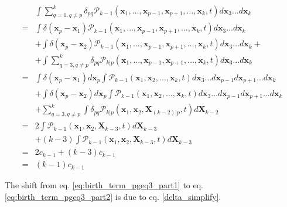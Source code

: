 \begin{subequations} 
\begin{flalign}
 & \int\sum_{q=1,q\neq p}^{k}\delta_{pq}\mathcal{P}_{k-1}(\boldsymbol{x}_{1},\ldots,\boldsymbol{x}_{p-1},\boldsymbol{x}_{p+1},\ldots,\boldsymbol{x}_{k},t)d\boldsymbol{x}_{3}\ldots d\boldsymbol{x}_{k}\\
= & \int\delta(\boldsymbol{x}_{p}-\boldsymbol{x}_{1})\mathcal{P}_{k-1}(\boldsymbol{x}_{1},\ldots,\boldsymbol{x}_{p-1},\boldsymbol{x}_{p+1},\ldots,\boldsymbol{x}_{k},t)d\boldsymbol{x}_{3}\ldots d\boldsymbol{x}_{k}\\
 & +\int\delta(\boldsymbol{x}_{p}-\boldsymbol{x}_{2})\mathcal{P}_{k-1}(\boldsymbol{x}_{1},\ldots,\boldsymbol{x}_{p-1},\boldsymbol{x}_{p+1},\ldots,\boldsymbol{x}_{k},t)d\boldsymbol{x}_{3}\ldots d\boldsymbol{x}_{k}+\\
 & +\int\sum_{q=3,q\neq p}^{k}\delta_{pq}\mathcal{P}_{k|p}(\boldsymbol{x}_{1},\ldots,\boldsymbol{x}_{p-1},\boldsymbol{x}_{p+1},\ldots,\boldsymbol{x}_{k},t)d\boldsymbol{x}_{3}\ldots d\boldsymbol{x}_{k}\\
= & \int\delta(\boldsymbol{x}_{p}-\boldsymbol{x}_{1})d\boldsymbol{x}_{p}\int\mathcal{P}_{k-1}(\boldsymbol{x}_{1},\boldsymbol{x}_{2},\ldots,\boldsymbol{x}_{k},t)d\boldsymbol{x}_{3}\ldots d\boldsymbol{x}_{p-1}d\boldsymbol{x}_{p+1}\ldots d\boldsymbol{x}_{k}\\
 & +\int\delta(\boldsymbol{x}_{p}-\boldsymbol{x}_{2})d\boldsymbol{x}_{p}\int\mathcal{P}_{k-1}(\boldsymbol{x}_{1},\boldsymbol{x}_{2},\ldots,\boldsymbol{x}_{k},t)d\boldsymbol{x}_{3}\ldots d\boldsymbol{x}_{p-1}d\boldsymbol{x}_{p+1}\ldots d\boldsymbol{x}_{k}\\
 & +\sum_{q=3,q\neq p}^{k}\int\delta_{pq}\mathcal{P}_{k|p}(\boldsymbol{x}_{1},\boldsymbol{x}_{2},\boldsymbol{X}_{(k-2)|p},t)d\boldsymbol{X}_{k-2}\label{eq:birth_term_pgeq3_part1}\\
= & 2\int\mathcal{P}_{k-1}(\boldsymbol{x}_{1},\boldsymbol{x}_{2},\boldsymbol{X}_{k-3},t)d\boldsymbol{X}_{k-3}\\
 & +(k-3)\int\mathcal{P}_{k-1}(\boldsymbol{x}_{1},\boldsymbol{x}_{2},\boldsymbol{X}_{k-3},t)d\boldsymbol{X}_{k-3}\label{eq:birth_term_pgeq3_part2}\\
= & 2c_{k-1}+(k-3)c_{k-1}\\
= & (k-1)c_{k-1}
\end{flalign}
\end{subequations}

The shift from eq. \ref{eq:birth_term_pgeq3_part1} to eq. \ref{eq:birth_term_pgeq3_part2}
is due to eq. \ref{delta_simplify}. 

